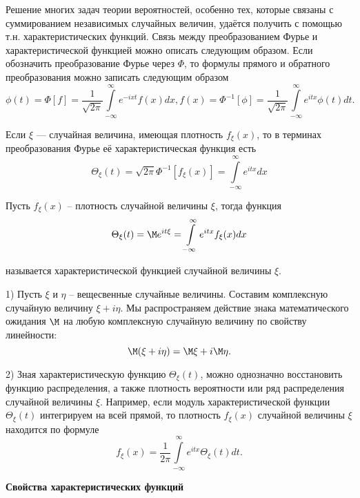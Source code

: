 
\begin{zam}
Решение многих задач теории вероятностей, особенно тех, которые связаны с суммированием независимых случайных величин, удаётся получить с помощью т.н. характеристических функций.
Связь между преобразованием Фурье и характеристической функцией можно описать следующим образом. Если обозначить преобразование Фурье через $\Phi$, то формулы прямого и обратного преобразования можно записать
следующим образом
\begin{equation*}
	\phi(t) = \Phi[f] = \frac{1}{\sqrt{2\pi}}\int\limits_{-\infty}^{\infty}e^{-ixt}f(x)dx,
	f(x) = \Phi^{-1}[\phi] = \frac{1}{\sqrt{2\pi}} \int\limits_{-\infty}^{\infty}e^{itx}\phi(t)dt.   
\end{equation*}

Если $\xi$ — случайная величина, имеющая плотность $f_{\xi}(x)$, то в терминах преобразования Фурье её характеристическая функция есть
$$\Theta_{\xi} (t) = \sqrt{2\pi}\Phi^{-1}[f_{\xi}(x)] = \int\limits_{-\infty}^{\infty}e^{itx}dx$$
\end{zam}

\begin{definition}
	Пусть $f_{\xi}(x)$ -- плотность случайной величины $\xi$,
тогда функция
$$\Theta_{\xi}(t) = \M e^{it\xi} = \int\limits_{-\infty}^{\infty} e^{itx}f_{\xi}(x)dx$$

называется характеристической функцией случайной величины $\xi$.
\end{definition}

\begin{zam}
1) Пусть $\xi$ и $\eta$ -- вещесвенные случайные величины. Составим комплексную случайную величину $\xi + i\eta$. Мы распространяем действие знака математического ожидания $\M$ на любую комплексную случайную величину по свойству линейности:
$$\M(\xi + i\eta) = \M\xi + i \M\eta.$$

2) Зная характеристическую функцию $\Theta_{\xi} (t)$, можно однозначно восстановить функцию распределения, а также плотность вероятности или ряд распределения случайной величины $\xi$. Например, если модуль характеристической функции $\Theta_{\xi} (t)$ интегрируем на всей прямой, то плотность $f_{\xi}(x)$
случайной величины $\xi$ находится по формуле
$$f_{\xi}(x) =\frac{1}{2\pi}\int\limits_{-\infty}^{\infty}e^{itx}\Theta_{\xi} (t) dt.$$
\end{zam}

\textbf{Свойства характеристических функций}

